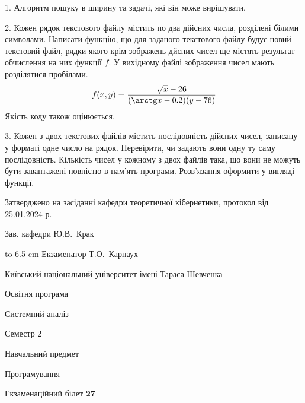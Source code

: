 \documentclass[12pt, ukrainian]{article}
\begin{document}
{%
1. Алгоритм пошуку в ширину та задачі, які він може вирішувати.%
\par
\vspace{2mm}

2. Кожен рядок текстового файлу містить по два дійсних числа, розділені білими символами.
Написати функцію, що для заданого текстового файлу будує новий текстовий файл, рядки якого крім зображень дйсних чисел ще містять результат обчислення на них функції $f$. У вихідному файлі зображення чисел мають розділятися пробілами. 
$$f(x, y) =\frac{\sqrt x - 26}{(\arctg x - 0.2) (y - 76)}$$ 
Якість коду також оцінюється.

\par
\vspace{2mm}

3. Кожен з двох текстових файлів містить послідовність дійсних чисел, записану у форматі одне число на рядок.  Перевірити, чи задають вони одну ту саму послідовність. Кількість чисел у кожному з двох файлів така, що вони не можуть бути завантажені повністю в пам'ять програми. Розв'язання оформити у вигляді функції.

}
{\smallskip\smallskip \begin {scriptsize} Затверджено на засіданні кафедри теоретичної кібернетики, протокол   від   25.01.2024 р.\par\smallskip\smallskip\smallskip\smallskip
{\parbox {6.5 cm} {Зав. кафедри \dotfill Ю.В.~Крак}}\hspace {0.7cm} {\hbox to 6.5 cm { Екзаменатор \dotfill Т.О.~Карнаух}} \end{scriptsize}}
\newpage
{{\begin {scriptsize}\par
{ \center  Київський національний університет імені Тараса Шевченка \par}
{\parbox {5 cm}{Освітня програма \hfill}{\parbox {7 cm}{Системний аналіз\hfill}}\parbox {6 cm}{\hfill Семестр 2}}\par
{\parbox {5 cm} {Навчальний предмет \hfill}\parbox {7 cm}{Програмування \hfill}\parbox {6cm}{\hfill}\par}\vspace{-15pt} \end{scriptsize}}{\center Екзаменаційний білет \No \textbf { 27 }\par}}
\end{document}

